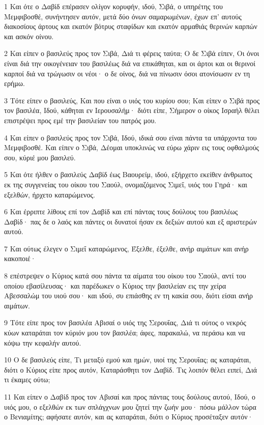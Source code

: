 \par 1 Και ότε ο Δαβίδ επέρασεν ολίγον κορυφήν, ιδού, Σιβά, ο υπηρέτης του Μεμφιβοσθέ, συνήντησεν αυτόν, μετά δύο όνων σαμαρωμένων, έχων επ' αυτούς διακοσίους άρτους και εκατόν βότρυς σταφίδων και εκατόν αρμαθιάς θερινών καρπών και ασκόν οίνου.
\par 2 Και είπεν ο βασιλεύς προς τον Σιβά, Διά τι φέρεις ταύτα; Ο δε Σιβά είπεν, Οι όνοι είναι διά την οικογένειαν του βασιλέως διά να επικάθηται, και οι άρτοι και οι θερινοί καρποί διά να τρώγωσιν οι νέοι· ο δε οίνος, διά να πίνωσιν όσοι ατονίσωσιν εν τη ερήμω.
\par 3 Τότε είπεν ο βασιλεύς, Και που είναι ο υιός του κυρίου σου; Και είπεν ο Σιβά προς τον βασιλέα, Ιδού, κάθηται εν Ιερουσαλήμ· διότι είπε, Σήμερον ο οίκος Ισραήλ θέλει επιστρέψει προς εμέ την βασιλείαν του πατρός μου.
\par 4 Και είπεν ο βασιλεύς προς τον Σιβά, Ιδού, ιδικά σου είναι πάντα τα υπάρχοντα του Μεμφιβοσθέ. Και είπεν ο Σιβά, Δέομαι υποκλινώς να εύρω χάριν εις τους οφθαλμούς σου, κύριέ μου βασιλεύ.
\par 5 Και ότε ήλθεν ο βασιλεύς Δαβίδ έως Βαουρείμ, ιδού, εξήρχετο εκείθεν άνθρωπος εκ της συγγενείας του οίκου του Σαούλ, ονομαζόμενος Σιμεΐ, υιός του Γηρά· και εξελθών, ήρχετο καταρώμενος.
\par 6 Και έρριπτε λίθους επί τον Δαβίδ και επί πάντας τους δούλους του βασιλέως Δαβίδ· πας δε ο λαός και πάντες οι δυνατοί ήσαν εκ δεξιών αυτού και εξ αριστερών αυτού.
\par 7 Και ούτως έλεγεν ο Σιμεΐ καταρώμενος, Έξελθε, έξελθε, ανήρ αιμάτων και ανήρ κακοποιέ·
\par 8 επέστρεψεν ο Κύριος κατά σου πάντα τα αίματα του οίκου του Σαούλ, αντί του οποίου εβασίλευσας· και παρέδωκεν ο Κύριος την βασιλείαν εις την χείρα Αβεσσαλώμ του υιού σου· και ιδού, συ επιάσθης εν τη κακία σου, διότι είσαι ανήρ αιμάτων.
\par 9 Τότε είπε προς τον βασιλέα Αβισαί ο υιός της Σερουΐας, Διά τι ούτος ο νεκρός κύων καταράται τον κύριόν μου τον βασιλέα; άφες, παρακαλώ, να περάσω και να κόψω την κεφαλήν αυτού.
\par 10 Ο δε βασιλεύς είπε, Τι μεταξύ εμού και ημών, υιοί της Σερουΐας; ας καταράται, διότι ο Κύριος είπε προς αυτόν, Καταράσθητι τον Δαβίδ. Τις λοιπόν θέλει ειπεί, Διά τι έκαμες ούτω;
\par 11 Και είπεν ο Δαβίδ προς τον Αβισαί και προς πάντας τους δούλους αυτού, Ιδού, ο υιός μου, ο εξελθών εκ των σπλάγχνων μου ζητεί την ζωήν μου· πόσω μάλλον τώρα ο Βενιαμίτης; αφήσατε αυτόν, και ας καταράται, διότι ο Κύριος προσέταξεν αυτόν·
